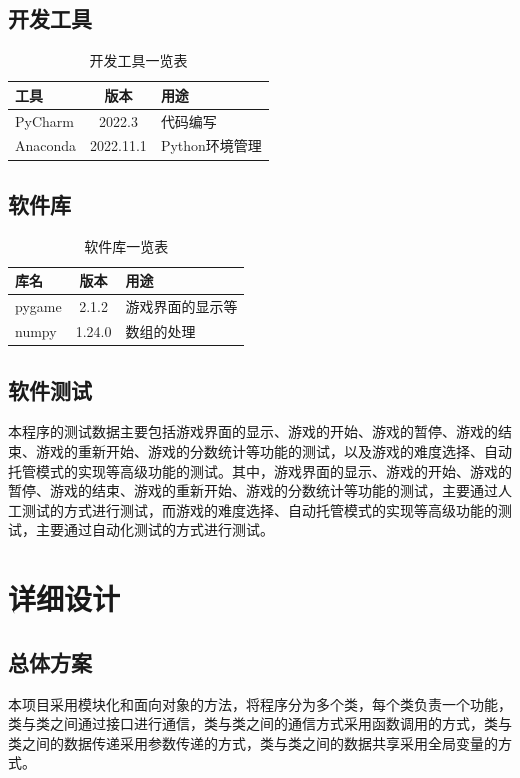 \documentclass[UTF8,AutoFakeBold,AutoFakeSlant,zihao=-4]{ctexart}
\begin{document}
\subsection{开发工具}
\begin{table}[H]
  \centering
  \caption{开发工具一览表}
  \label{tab:dev-tool}
  \begin{tabular}{@{}lcl@{}}
    \toprule
    工具 & 版本 & 用途 \\ \midrule
    PyCharm & 2022.3 & 代码编写 \\ 
    Anaconda & 2022.11.1 & Python环境管理 \\ \bottomrule
  \end{tabular}
\end{table}



\subsection{软件库}
\begin{table}[H]
  \centering
  \caption{软件库一览表}
  \label{tab:soft-lib}
  \begin{tabular}{@{}lcl@{}}
    \toprule
    库名 & 版本 & 用途 \\ \midrule
    pygame & 2.1.2 & 游戏界面的显示等 \\ 
    numpy & 1.24.0 & 数组的处理 \\
    \bottomrule
  \end{tabular}
\end{table}




\subsection{软件测试}
本程序的测试数据主要包括游戏界面的显示、游戏的开始、游戏的暂停、游戏的结束、游戏的重新开始、游戏的分数统计等功能的测试，以及游戏的难度选择、自动托管模式的实现等高级功能的测试。其中，游戏界面的显示、游戏的开始、游戏的暂停、游戏的结束、游戏的重新开始、游戏的分数统计等功能的测试，主要通过人工测试的方式进行测试，而游戏的难度选择、自动托管模式的实现等高级功能的测试，主要通过自动化测试的方式进行测试。
\clearpage

\section{详细设计}
\subsection{总体方案}
本项目采用模块化和面向对象的方法，将程序分为多个类，每个类负责一个功能，类与类之间通过接口进行通信，类与类之间的通信方式采用函数调用的方式，类与类之间的数据传递采用参数传递的方式，类与类之间的数据共享采用全局变量的方式。
\end{document}

